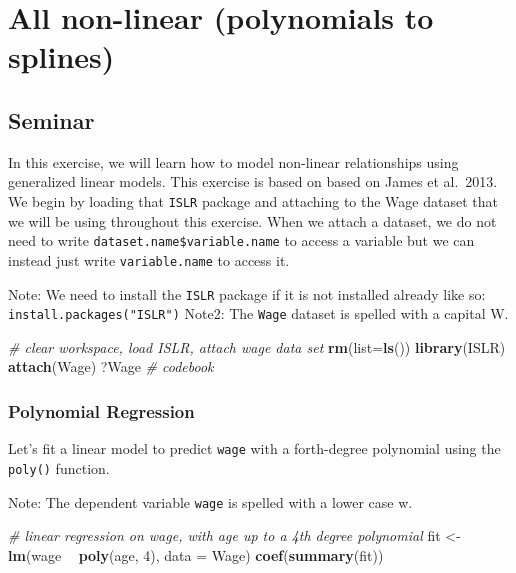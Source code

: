 \documentclass[]{article}
\newenvironment{Shaded}{\begin{snugshade}}{\end{snugshade}}
\newcommand{\CommentTok}[1]{\textcolor[rgb]{0.56,0.35,0.01}{\textit{#1}}}
\newcommand{\DataTypeTok}[1]{\textcolor[rgb]{0.13,0.29,0.53}{#1}}
\newcommand{\DecValTok}[1]{\textcolor[rgb]{0.00,0.00,0.81}{#1}}
\newcommand{\KeywordTok}[1]{\textcolor[rgb]{0.13,0.29,0.53}{\textbf{#1}}}
\newcommand{\NormalTok}[1]{#1}
\newcommand{\OperatorTok}[1]{\textcolor[rgb]{0.81,0.36,0.00}{\textbf{#1}}}
\newcommand{\StringTok}[1]{\textcolor[rgb]{0.31,0.60,0.02}{#1}}
\begin{document}
\hypertarget{all-non-linear-polynomials-to-splines}{%
\section{All non-linear (polynomials to splines)}\label{all-non-linear-polynomials-to-splines}}

\hypertarget{seminar-4}{%
\subsection{Seminar}\label{seminar-4}}

In this exercise, we will learn how to model non-linear relationships using generalized linear models. This exercise is based on based on James et al.~2013. We begin by loading that \texttt{ISLR} package and attaching to the Wage dataset that we will be using throughout this exercise. When we attach a dataset, we do not need to write \texttt{dataset.name\$variable.name} to access a variable but we can instead just write \texttt{variable.name} to access it.

Note: We need to install the \texttt{ISLR} package if it is not installed already like so: \texttt{install.packages("ISLR")}
Note2: The \texttt{Wage} dataset is spelled with a capital W.

\begin{Shaded}
\begin{Highlighting}[]
\CommentTok{# clear workspace, load ISLR, attach wage data set}
\KeywordTok{rm}\NormalTok{(}\DataTypeTok{list=}\KeywordTok{ls}\NormalTok{())}
\KeywordTok{library}\NormalTok{(ISLR)}
\KeywordTok{attach}\NormalTok{(Wage)}
\NormalTok{?Wage }\CommentTok{# codebook}
\end{Highlighting}
\end{Shaded}

\hypertarget{polynomial-regression}{%
\subsubsection{Polynomial Regression}\label{polynomial-regression}}

Let's fit a linear model to predict \texttt{wage} with a forth-degree polynomial using the \texttt{poly()} function.

Note: The dependent variable \texttt{wage} is spelled with a lower case w.

\begin{Shaded}
\begin{Highlighting}[]
\CommentTok{# linear regression on wage, with age up to a 4th degree polynomial}
\NormalTok{fit <-}\StringTok{ }\KeywordTok{lm}\NormalTok{(wage }\OperatorTok{~}\StringTok{ }\KeywordTok{poly}\NormalTok{(age, }\DecValTok{4}\NormalTok{), }\DataTypeTok{data =}\NormalTok{ Wage)}
\KeywordTok{coef}\NormalTok{(}\KeywordTok{summary}\NormalTok{(fit))}
\end{Highlighting}
\end{Shaded}
\end{document}
